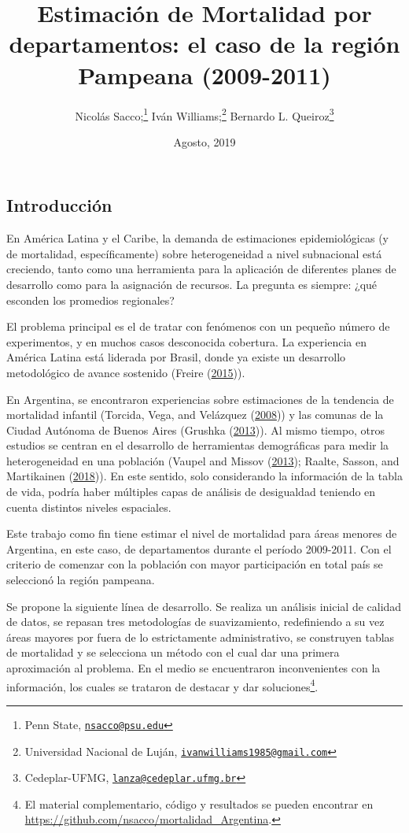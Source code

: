 \documentclass[12pt,]{article}
\title{Estimación de Mortalidad por departamentos: el caso de la región
Pampeana (2009-2011)}
\author{Nicolás Sacco;\footnote{Penn State,
  \href{mailto:nsacco@psu.edu}{\nolinkurl{nsacco@psu.edu}}} Iván
Williams;\footnote{Universidad Nacional de Luján,
  \href{mailto:ivanwilliams1985@gmail.com}{\nolinkurl{ivanwilliams1985@gmail.com}}}
Bernardo L. Queiroz\footnote{Cedeplar-UFMG,
  \href{mailto:lanza@cedeplar.ufmg.br}{\nolinkurl{lanza@cedeplar.ufmg.br}}}}
\date{Agosto, 2019}
\begin{document}
\maketitle

\hypertarget{introducciuxf3n}{%
\subsection{\texorpdfstring{\textbf{Introducción}}{Introducción}}\label{introducciuxf3n}}

En América Latina y el Caribe, la demanda de estimaciones
epidemiológicas (y de mortalidad, específicamente) sobre heterogeneidad
a nivel subnacional está creciendo, tanto como una herramienta para la
aplicación de diferentes planes de desarrollo como para la asignación de
recursos. La pregunta es siempre: ¿qué esconden los promedios
regionales?

El problema principal es el de tratar con fenómenos con un pequeño
número de experimentos, y en muchos casos desconocida cobertura. La
experiencia en América Latina está liderada por Brasil, donde ya existe
un desarrollo metodológico de avance sostenido (Freire
(\protect\hyperlink{ref-FreireEtAl2015}{2015})).

En Argentina, se encontraron experiencias sobre estimaciones de la
tendencia de mortalidad infantil (Torcida, Vega, and Velázquez
(\protect\hyperlink{ref-torcida2008}{2008})) y las comunas de la Ciudad
Autónoma de Buenos Aires (Grushka
(\protect\hyperlink{ref-Grushka2013}{2013})). Al mismo tiempo, otros
estudios se centran en el desarrollo de herramientas demográficas para
medir la heterogeneidad en una población (Vaupel and Missov
(\protect\hyperlink{ref-Vaupel_Missov_2013}{2013}); Raalte, Sasson, and
Martikainen
(\protect\hyperlink{ref-vanRaalte_Sasson_Martikainen_2018}{2018})). En
este sentido, solo considerando la información de la tabla de vida,
podría haber múltiples capas de análisis de desigualdad teniendo en
cuenta distintos niveles espaciales.

Este trabajo como fin tiene estimar el nivel de mortalidad para áreas
menores de Argentina, en este caso, de departamentos durante el período
2009-2011. Con el criterio de comenzar con la población con mayor
participación en total país se seleccionó la región pampeana.

Se propone la siguiente línea de desarrollo. Se realiza un análisis
inicial de calidad de datos, se repasan tres metodologías de
suavizamiento, redefiniendo a su vez áreas mayores por fuera de lo
estrictamente administrativo, se construyen tablas de mortalidad y se
selecciona un método con el cual dar una primera aproximación al
problema. En el medio se encuentraron inconvenientes con la información,
los cuales se trataron de destacar y dar soluciones\footnote{El material
  complementario, código y resultados se pueden encontrar en
  \url{https://github.com/nsacco/mortalidad_Argentina}.}.
\end{document}
